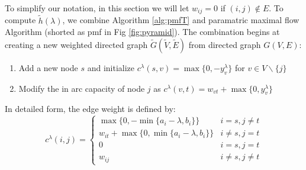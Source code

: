 \documentclass{article}
\begin{document}
To simplify our notation, in this section we will let $w_{ij} = 0$ if $(i,j) \not\in E$. To compute $\tilde{h}(\lambda)$, we combine Algorithm \ref{alg:pmfT} and paramatric maximal flow Algorithm (shorted as pmf in Fig \ref{fig:pyramid}). The combination begins at creating a new weighted directed graph $\widetilde{G}(\widetilde{V}, \widetilde{E})$ from directed graph $G(V,E)$:
\begin{enumerate}
	\item Add a new node $s$ and initialize $c^{\lambda}(s,v)=\max\{0, -y^{\lambda}_v\}$ for $v \in V\backslash \{j\}$
	\item Modify the in arc capacity of node $j$ as $c^{\lambda}(v,t) = w_{vt} + \max\{0, y^{\lambda}_v\}$
	\end{enumerate}
In detailed form, the edge weight is defined by:
\begin{equation}
c^{\lambda}(i, j) = 
\begin{cases}
	\max\{0, -\min\{a_i-\lambda, b_i\}\} &  i = s, j \neq t \\
	w_{it} + \max\{0, \min\{a_i - \lambda, b_i\}\} & i\neq s, j = t\\
	0 & i = s, j = t\\
	w_{ij} & i \neq s, j \neq t
\end{cases}
\end{equation}
\end{document}
